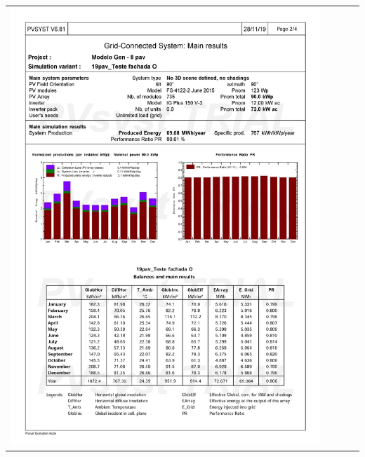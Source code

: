 \begin{table}[H]
    \centering
    \begin{tabular}{l}
        \includegraphics[width=0.9\textwidth]{figures/attachments/resultpv28.jpg}
    \end{tabular}
\end{table}
\pagebreak
